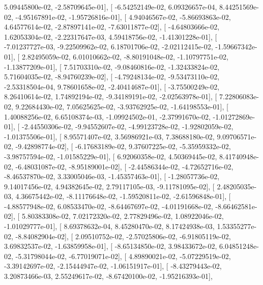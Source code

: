 \documentclass{article}
\begin{document}
          5.09445800e-02,  -2.58709645e-01],
       [ -6.54252149e-02,   6.09326657e-04,   8.44251569e-02,
         -4.95167891e-02,  -1.95726816e-01],
       [  4.94046567e-02,  -5.86693863e-02,   4.64577614e-02,
         -2.87897141e-02,  -7.63011877e-02],
       [ -4.64803666e-02,   1.62053304e-02,  -2.22317647e-03,
          4.59418756e-02,  -1.41301228e-01],
       [ -7.01237727e-03,  -9.22509962e-02,   6.18701706e-02,
         -2.02112415e-02,  -1.59667342e-01],
       [  2.82495059e-02,   6.01010662e-02,  -8.80191048e-02,
         -1.10797751e-02,  -1.13877209e-01],
       [  7.51703310e-02,  -9.08460816e-02,  -1.32433824e-02,
          5.71604035e-02,  -8.94760239e-02],
       [ -4.79248134e-02,  -9.53473110e-02,  -2.53318504e-04,
          9.78601658e-02,  -2.40414687e-01],
       [ -3.75500249e-02,   8.26410614e-02,   1.74892194e-02,
         -9.34189191e-02,  -2.02563978e-01],
       [  7.22806083e-02,   9.22684430e-02,   7.05625625e-02,
         -3.93762925e-02,  -1.64198553e-01],
       [  1.40088256e-02,   6.65108374e-03,  -1.09924502e-01,
         -2.37991670e-02,  -1.01272869e-01],
       [ -2.44550306e-02,  -9.94552607e-02,  -4.99123728e-02,
         -1.92802059e-02,  -1.01375506e-01],
       [  8.95571407e-02,   3.56986921e-03,   7.38688180e-02,
          9.09706571e-02,  -9.42898774e-02],
       [ -6.17683189e-02,   9.37607225e-02,  -5.35959332e-02,
         -3.98757594e-02,  -1.01585229e-01],
       [  6.92060358e-02,   4.50369445e-02,   8.41740948e-02,
         -6.48031087e-02,  -8.95189001e-02],
       [ -2.44586344e-02,  -4.72652716e-02,  -8.46537870e-02,
          3.33005046e-03,  -1.45357463e-01],
       [ -1.28057736e-02,   9.14017456e-02,   4.94382645e-02,
          2.79117105e-03,  -9.11781095e-02],
       [  2.48205035e-03,   4.36675442e-02,  -8.11176648e-02,
         -1.59520811e-02,  -2.61596848e-01],
       [ -4.88577948e-02,   6.08533470e-02,  -8.64467697e-02,
         -4.01191668e-02,  -8.66462581e-02],
       [  5.80383308e-02,   7.02172320e-02,   2.77829496e-02,
          1.08922046e-02,  -1.01029777e-01],
       [  8.69378632e-04,   8.45280470e-02,   8.17424938e-03,
          1.53355277e-02,  -8.84082904e-02],
       [  2.09510752e-02,  -2.57025806e-02,  -6.91805119e-02,
          3.69832537e-02,  -1.63859958e-01],
       [ -8.65134850e-02,   3.98433672e-02,   6.04851248e-02,
         -5.31798044e-02,  -6.77019071e-02],
       [  4.89890021e-02,  -5.07229519e-02,  -3.39142697e-02,
         -2.15444947e-02,  -1.06151917e-01],
       [ -8.43279443e-02,   3.20873466e-03,   2.55249617e-02,
         -8.67420100e-02,  -1.95216393e-01],
\end{document}
